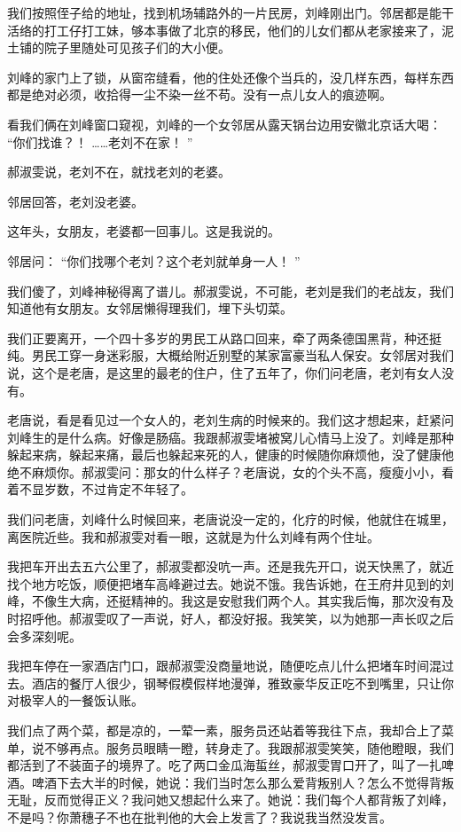 \documentclass[12pt,twoside,openany]{book}
\begin{document}
我们按照侄子给的地址，找到机场辅路外的一片民房，刘峰刚出门。邻居都是能干活络的打工仔打工妹，够本事做了北京的移民，他们的儿女们都从老家接来了，泥土铺的院子里随处可见孩子们的大小便。

刘峰的家门上了锁，从窗帘缝看，他的住处还像个当兵的，没几样东西，每样东西都是绝对必须，收拾得一尘不染一丝不苟。没有一点儿女人的痕迹啊。

看我们俩在刘峰窗口窥视，刘峰的一个女邻居从露天锅台边用安徽北京话大喝： “你们找谁？！ ……老刘不在家！ ”

郝淑雯说，老刘不在，就找老刘的老婆。

邻居回答，老刘没老婆。

这年头，女朋友，老婆都一回事儿。这是我说的。

邻居问： “你们找哪个老刘？这个老刘就单身一人！ ”

我们傻了，刘峰神秘得离了谱儿。郝淑雯说，不可能，老刘是我们的老战友，我们知道他有女朋友。女邻居懒得理我们，埋下头切菜。

我们正要离开，一个四十多岁的男民工从路口回来，牵了两条德国黑背，种还挺纯。男民工穿一身迷彩服，大概给附近别墅的某家富豪当私人保安。女邻居对我们说，这个是老唐，是这里的最老的住户，住了五年了，你们问老唐，老刘有女人没有。

老唐说，看是看见过一个女人的，老刘生病的时候来的。我们这才想起来，赶紧问刘峰生的是什么病。好像是肠癌。我跟郝淑雯堵被窝儿心情马上没了。刘峰是那种躲起来病，躲起来痛，最后也躲起来死的人，健康的时候随你麻烦他，没了健康他绝不麻烦你。郝淑雯问：那女的什么样子？老唐说，女的个头不高，瘦瘦小小，看着不显岁数，不过肯定不年轻了。

我们问老唐，刘峰什么时候回来，老唐说没一定的，化疗的时候，他就住在城里，离医院近些。我和郝淑雯对看一眼，这就是为什么刘峰有两个住址。

我把车开出去五六公里了，郝淑雯都没吭一声。还是我先开口，说天快黑了，就近找个地方吃饭，顺便把堵车高峰避过去。她说不饿。我告诉她，在王府井见到的刘峰，不像生大病，还挺精神的。我这是安慰我们两个人。其实我后悔，那次没有及时招呼他。郝淑雯叹了一声说，好人，都没好报。我笑笑，以为她那一声长叹之后会多深刻呢。

我把车停在一家酒店门口，跟郝淑雯没商量地说，随便吃点儿什么把堵车时间混过去。酒店的餐厅人很少，钢琴假模假样地漫弹，雅致豪华反正吃不到嘴里，只让你对极宰人的一餐饭认账。

我们点了两个菜，都是凉的，一荤一素，服务员还站着等我往下点，我却合上了菜单，说不够再点。服务员眼睛一瞪，转身走了。我跟郝淑雯笑笑，随他瞪眼，我们都活到了不装面子的境界了。吃了两口金瓜海蜇丝，郝淑雯胃口开了，叫了一扎啤酒。啤酒下去大半的时候，她说：我们当时怎么那么爱背叛别人？怎么不觉得背叛无耻，反而觉得正义？我问她又想起什么来了。她说：我们每个人都背叛了刘峰，不是吗？你萧穗子不也在批判他的大会上发言了？我说我当然没发言。
\end{document}
